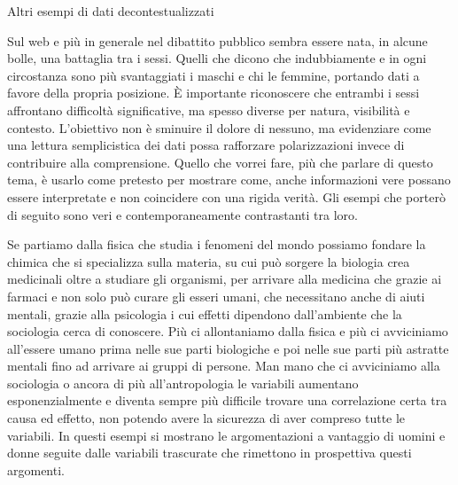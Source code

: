 \documentclass[12pt]{book} %
\begin{document}
\begin{mdframed}[linewidth=1pt]
Altri esempi di dati decontestualizzati

Sul web e più in generale nel dibattito pubblico sembra essere nata, in alcune bolle, una battaglia tra i sessi. Quelli che dicono che indubbiamente e in ogni circostanza sono più svantaggiati i maschi e chi le femmine, portando dati a favore della propria posizione.
È importante riconoscere che entrambi i sessi affrontano difficoltà significative, ma spesso diverse per natura, visibilità e contesto. L'obiettivo non è sminuire il dolore di nessuno, ma evidenziare come una lettura semplicistica dei dati possa rafforzare polarizzazioni invece di contribuire alla comprensione.
Quello che vorrei fare, più che parlare di questo tema, è usarlo come pretesto per mostrare come, anche informazioni vere possano essere interpretate e non coincidere con una rigida verità. Gli esempi che porterò di seguito sono veri e contemporaneamente contrastanti tra loro. 

Se partiamo dalla fisica che studia i fenomeni del mondo possiamo fondare la chimica che si specializza sulla materia, su cui può sorgere la biologia crea medicinali oltre a studiare gli organismi, per arrivare alla medicina che grazie ai farmaci e non solo può curare gli esseri umani, che necessitano anche di aiuti mentali, grazie alla psicologia i cui effetti dipendono dall'ambiente che la sociologia cerca di conoscere. Più ci allontaniamo dalla fisica e più ci avviciniamo all'essere umano prima nelle sue parti biologiche e poi nelle sue parti più astratte mentali fino ad arrivare ai gruppi di persone. Man mano che ci avviciniamo alla sociologia o ancora di più all'antropologia le variabili aumentano esponenzialmente e diventa sempre più difficile trovare una correlazione certa tra causa ed effetto, non potendo avere la sicurezza di aver compreso tutte le variabili. 
In questi esempi si mostrano le argomentazioni a vantaggio di uomini e donne seguite dalle variabili trascurate che rimettono in prospettiva questi argomenti.


\end{mdframed}
\end{document}
